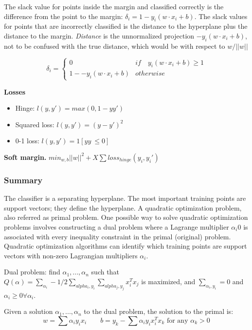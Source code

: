 \documentclass{article}
\begin{document}
The slack value for points inside the margin and classified correctly is the difference from the point to the margin: \(\delta_i = 1 - y_i (w \cdot x_i + b)\). The slack values for points that are incorrectly classified is the distance to the hyperplane plus the distance to the margin. \emph{Distance} is the unnormalized projection \( - y_i(w \cdot x_i+b)\), not to be confused with the true distance, which would be with respect to \(w/||w||\)

\[\delta_i = \left\{\begin{array}{ll}
0 & if \quad y_i(w \cdot x_i + b) \geq 1\\
1 -  - y_i(w \cdot x_i+b) & otherwise
\end{array}\right.\]

\textbf{Losses }
\begin{itemize}
	\item Hinge: \(l(y, y') = max(0, 1 - yy')\)
	\item Squared loss: \(l(y, y') = (y-y')^2\)
	\item 0-1 loss: \(l(y, y') = 1[yy\ \leq 0]\)
\end{itemize}


\textbf{Soft margin. } \(min_{w, b} ||w||^2 + X \sum loss_{hinge}(y_i, y_i')\)



\bigskip

\subsubsection*{Summary}

The classifier is a separating hyperplane. The most important training points are support vectors; they define the
hyperplane. A quadratic optimization problem, also referred as primal problem. One possible way to solve quadratic optimization problems involves constructing a dual problem where a Lagrange multiplier $\alpha_i0$ is associated with every inequality constraint in the primal (original) problem. Quadratic optimization algorithms can identify which training points are support vectors with non-zero Lagrangian multipliers $\alpha_i$.

\bigskip 

Dual problem: find \(\alpha_1, ..., \alpha_n\) such that \(Q(\alpha) = \sum_{\alpha_i} - 1/2 \sum_{alpha_i, y_i} \sum_{alpha_j, y_j} x_i^Tx_j\) is maximized, and \(\sum_{\alpha_i, y_i} = 0\) and \(\alpha_i \geq 0 \forall \alpha_i\). 

Given a solution \(\alpha_1, ..., \alpha_n\) to the dual problem, the solution to the primal is: \[w = \sum \alpha_i y_i x_i \qquad b = y_k - \sum \alpha_i y_i x_i^Tx_k \text{ for any } \alpha_k > 0\]
\end{document}
